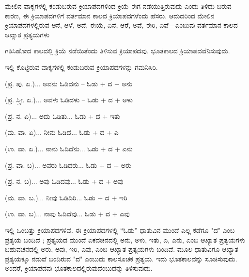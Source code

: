 \indent ಮೇಲಿನ ವಾಕ್ಯಗಳಲ್ಲಿ ಕಂಡುಬರುವ ಕ್ರಿಯಾಪದಗಳಿಂದ ಕ್ರಿಯೆ ಈಗ ನಡೆಯುತ್ತಿರುವುದು ಎಂದು ತಿಳಿದು ಬರುವ ಕಾರಣ, ಈ ಕ್ರಿಯಾಪದಗಳಿಗೆ ವರ್ತಮಾನ ಕಾಲದ ಕ್ರಿಯಾಪದಗಳೆಂದು ಹೆಸರು. ಆದುದರಿಂದ ಮೇಲಿನ ಕ್ರಿಯಾಪದಗಳಲ್ಲಿರುವ ಆನೆ, ಆಳೆ, ಅದೆ, ಈಯೆ, ಏನೆ, ಆರೆ, ಅವೆ, ಈರಿ, ಏವೆ—ಎಂಬುವು ವರ್ತಮಾನ ಕಾಲದ ಆಖ್ಯಾತ ಪ್ರತ್ಯಯಗಳು\par

\vspace{4pt plus 4pt minus 1pt}\hspace{0.5em}ಗತಿಸಿಹೋದ ಕಾಲದಲ್ಲಿ ಕ್ರಿಯೆ ನಡೆಯಿತೆಂದು ತಿಳಿಸುವ ಕ್ರಿಯಾಪದವು. ಭೂತಕಾಲದ ಕ್ರಿಯಾಪದವೆನಿಸುವುದು.\par

\indent ಇಲ್ಲಿ ಕೊಟ್ಟಿರುವ ವಾಕ್ಯಗಳಲ್ಲಿ ಕಂಡುಬರುವ ಕ್ರಿಯಾಪದಗಳನ್ನು ಗಮನಿಸಿರಿ.\par

\indent (ಪ್ರ. ಪು. ಏ.)... ಅವನು ಓಡಿದನು -- ಓಡು + ದ + ಅನು\par

\indent (ಪ್ರ. ಸ್ತ್ರೀ. ಏ.)... ಅವಳು ಓಡಿದಳು -- ಓಡು + ದ + ಅಳು\par

\indent (ಪ್ರ. ನ. ಏ)... ಅದು ಓಡಿತು... ಓಡು + ದ + ಇತು\par

\indent (ಮ. ವಾ. ಏ)... ನೀನು ಓಡಿದೆ... ಓಡು + ದ + ಎ\par

\indent (ಉ. ವಾ. ಏ.)... ನಾನು ಓಡಿದೆನು... ಓಡು + ದ + ಎನು\par

\indent (ಪ್ರ. ವಾ. ಬ)... ಅವರು ಓಡಿದರು... ಓಡು + ದ + ಅರು\par

\indent (ಪ್ರ. ನ. ಬ)... ಅವು ಓಡಿದವು... ಓಡು + ದ + ಅವು\par

\indent (ಮ. ವಾ. ಬ.)... ನೀವು ಓಡಿದಿರಿ... ಓಡು + ದ + ಇರಿ\par

\indent (ಉ. ವಾ. ಬ)... ನಾವು ಓಡಿದೆವು... ಓಡು + ದ + ಎವು\par

\indent ಇಲ್ಲಿ ಒಂಬತ್ತು ಕ್ರಿಯಾಪದಗಳಿವೆ. ಈ ಕ್ರಿಯಾಪದಗಳಲ್ಲಿ “ಓಡು” ಧಾತುವಿನ ಮುಂದೆ ಎಲ್ಲ ಕಡೆಗೂ "ದ" ಎಂಬ ಪ್ರತ್ಯಯ ಬಂದಿದೆ ; ಪ್ರತ್ಯಯದ ಮುಂದೆ ಏಕವಚನದಲ್ಲಿ ಅನು, ಅಳು, ಇತು, ಎ, ಎನು, ಎಂಬ ಆಖ್ಯಾತ ಪ್ರತ್ಯಯಗಳು ಬಹುವಚನದಲ್ಲಿ ಅರು, ಅವು, ಇರಿ, ಎವು, ಎಂಬ ಆಖ್ಯಾತ ಪ್ರತ್ಯಯಗಳು ಬಂದಿವೆ. ಮೂಲ ಧಾತುವಿಗೂ ಆಖ್ಯಾತ ಪ್ರತ್ಯಯಕ್ಕೂ ನಡುವೆ ಬಂದಿರುವ "ದ" ಎಂಬುದು ಕಾಲಸೂಚಕ ಪ್ರತ್ಯಯ. ಇದು ಭೂತಕಾಲವನ್ನು ಸೂಚಿಸುವುದು. ಅಂದರೆ, ಕ್ರಿಯಾಪದವು ಭೂತಕಾಲದಲ್ಲಿರುವುದೆಂಬುದನ್ನು ತಿಳಿಸುವುದು.\par
